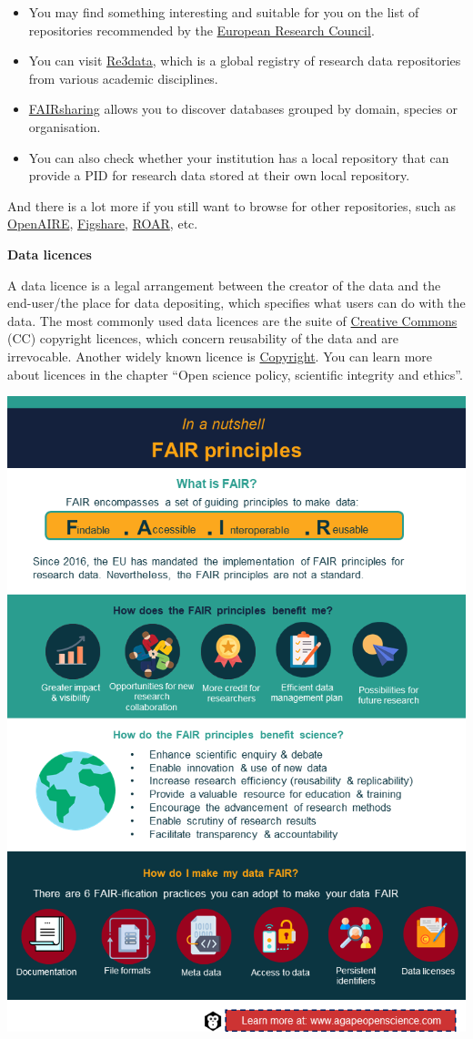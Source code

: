 \documentclass[
]{book}
\begin{document}
\begin{itemize}
\item
  You may find something interesting and suitable for you on the list of repositories recommended by the \href{https://erc.europa.eu/funding-and-grants/managing-project/open-access}{European Research Council}.
\item
  You can visit \href{https://www.re3data.org/}{Re3data}, which is a global registry of research data repositories from various academic disciplines.
\item
  \href{https://fairsharing.org/search?fairsharingRegistry=Database}{FAIRsharing} allows you to discover databases grouped by domain, species or organisation.
\item
  You can also check whether your institution has a local repository that can provide a PID for research data stored at their own local repository.
\end{itemize}

And there is a lot more if you still want to browse for other repositories, such as \href{https://explore.openaire.eu/participate/deposit/learn-how}{OpenAIRE}, \href{https://figshare.com/}{Figshare}, \href{http://roar.eprints.org/}{ROAR}, etc.

\textbf{Data licences}

A data licence is a legal arrangement between the creator of the data and the end-user/the place for data depositing, which specifies what users can do with the data. The most commonly used data licences are the suite of \href{https://en.wikipedia.org/wiki/Creative_Commons}{Creative Commons} (CC) copyright licences, which concern reusability of the data and are irrevocable. Another widely known licence is \href{https://en.wikipedia.org/wiki/Copyright}{Copyright}. You can learn more about licences in the chapter ``Open science policy, scientific integrity and ethics''.

\begin{center}\includegraphics[width=0.7\linewidth]{images/slide6} \end{center}
\end{document}
